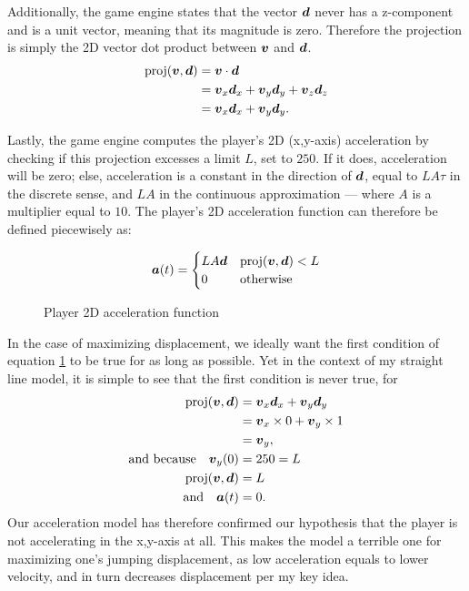 Additionally, the game engine states that the vector $\boldsymbol{d}$ never has a z-component and is a unit vector, meaning that its magnitude is zero. Therefore the projection is simply the 2D vector dot product between $\boldsymbol{v}$ and $\boldsymbol{d}$.
\begin{align*}
    \text{proj}(\boldsymbol{v}, \boldsymbol{d}) &= \boldsymbol{v} \cdot \boldsymbol{d}\\
    &= \boldsymbol{v}_x \boldsymbol{d}_x + \boldsymbol{v}_y \boldsymbol{d}_y + \boldsymbol{v}_z \boldsymbol{d}_z\\
    &= \boldsymbol{v}_x \boldsymbol{d}_x + \boldsymbol{v}_y \boldsymbol{d}_y.
\end{align*}

Lastly, the game engine computes the player's 2D (x,y-axis) acceleration by checking if this projection excesses a limit $L$, set to $250$. If it does, acceleration will be zero; else, acceleration is a constant in the direction of $\boldsymbol{d}$, equal to $LA\tau$ in the discrete sense, and $LA$ in the continuous approximation --- where $A$ is a multiplier equal to $10$. The player's 2D acceleration function can therefore be defined piecewisely as:
\begin{figure}[H]
    \centering
    \[
        \boldsymbol{a}(t) = \begin{cases}
            LA \boldsymbol{d} & \text{proj}(\boldsymbol{v}, \boldsymbol{d}) < L\\
            0 & \text{otherwise}
        \end{cases}
    \]
        \caption{Player 2D acceleration function}
    \label{eq:playeracceleration}

\end{figure}

In the case of maximizing displacement, we ideally want the first condition of equation \ref{eq:playeracceleration} to be true for as long as possible. Yet in the context of my straight line model, it is simple to see that the first condition is never true, for
\begin{align*}
    \text{proj}(\boldsymbol{v}, \boldsymbol{d}) &= \boldsymbol{v}_x \boldsymbol{d}_x + \boldsymbol{v}_y \boldsymbol{d}_y\\
    &= \boldsymbol{v}_x \times 0 + \boldsymbol{v}_y \times 1\\
    &= \boldsymbol{v}_y,\\
    \text{and because} \quad \boldsymbol{v}_{y}(0) &= 250 = L\\
    \text{proj}(\boldsymbol{v}, \boldsymbol{d}) &= L\\
    \text{and} \quad \boldsymbol{a}(t) &= 0.
\end{align*}
Our acceleration model has therefore confirmed our hypothesis that the player is not accelerating in the x,y-axis at all. This makes the model a terrible one for maximizing one's jumping displacement, as low acceleration equals to lower velocity, and in turn decreases displacement per my key idea.

